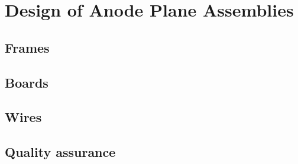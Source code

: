 \chapter{Design of Anode Plane Assemblies}
\label{ch:fdsp-apa-design}

\section{Frames}
\label{sec:fdsp-apa-frames}


\section{Boards}
\label{sec:fdsp-apa-boards}


\section{Wires}
\label{sec:fdsp-apa-wires}


\section{Quality assurance}
\label{sec:fdsp-apa-qa}



